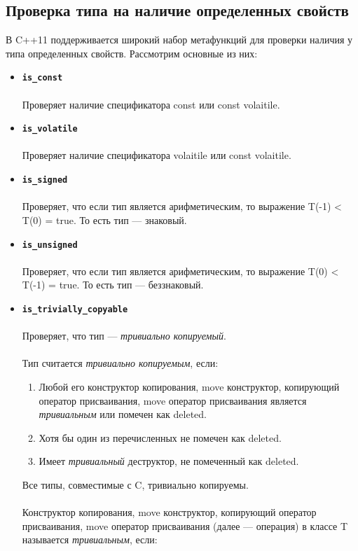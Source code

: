\subsection{Проверка типа на наличие определенных свойств}
В C++11 поддерживается широкий набор метафункций для проверки наличия у типа определенных свойств. Рассмотрим основные из них:
\begin{itemize}
\item \textbf{\texttt{is\_const}} \\\\
Проверяет наличие спецификатора const или const volaitile.
\item \textbf{\texttt{is\_volatile}} \\\\
Проверяет наличие спецификатора volaitile или const volaitile.
\item \textbf{\texttt{is\_signed}} \\\\
Проверяет, что если тип является арифметическим, то выражение T(-1) < T(0) = true.
То есть тип --- знаковый.
\item \textbf{\texttt{is\_unsigned}} \\\\
Проверяет, что если тип является арифметическим, то выражение T(0) < T(-1) = true.
То есть тип --- беззнаковый.
\item \texttt{\textbf{is\_trivially\_copyable}} \\\\
Проверяет, что тип --- \textit{тривиально копируемый}. \\\\
Тип считается \textit{тривиально копируемым}, если:
\begin{enumerate} 
\item Любой его конструктор копирования, move конструктор, копирующий оператор присваивания, 
move оператор присваивания является \textit{тривиальным} или помечен как deleted.
\item Хотя бы один из перечисленных не помечен как deleted.
\item Имеет \textit{тривиальный} деструктор, не помеченный как deleted.
\end{enumerate}
Все типы, совместимые с C, тривиально копируемы. \\\\
Конструктор копирования, move конструктор, копирующий оператор присваивания, 
move оператор присваивания (далее --- операция) в классе T называется \textit{тривиальным}, если:

\end{itemize}
